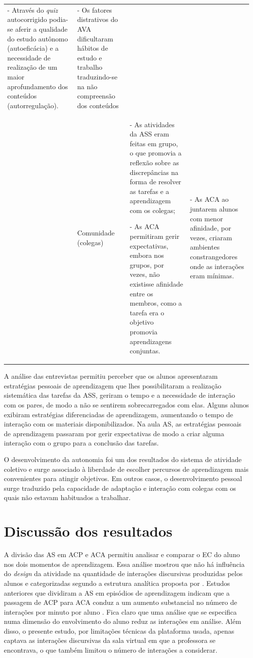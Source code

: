 \documentclass[portuguese]{textolivre}
\begin{document}
\begin{table}[htpb]
\begin{tabular}{p{}p{}p{}p{}}
- Através do \textit{quiz} autocorrigido podia-se aferir a qualidade do estudo autônomo (autoeficácia) e a necessidade de realização de um maior aprofundamento dos conteúdos (autorregulação). & - Os fatores distrativos do AVA dificultaram hábitos de estudo e trabalho traduzindo-se na não compreensão dos conteúdos
\\
& Comunidade (colegas) & - As atividades da ASS eram feitas em grupo, o que promovia a reflexão sobre as discrepâncias na forma de resolver as tarefas e a aprendizagem com os colegas;

- As ACA permitiram gerir expectativas, embora nos grupos, por vezes, não existisse afinidade entre os membros, como a tarefa era o objetivo promovia aprendizagens conjuntas. & - As ACA ao juntarem alunos com menor afinidade, por vezes, criaram ambientes constrangedores onde as interações eram mínimas.
\\
\bottomrule
\end{tabular}
\end{table}

A análise das entrevistas permitiu perceber que os alunos apresentaram estratégias pessoais de aprendizagem que lhes possibilitaram a realização sistemática das tarefas da ASS, geriram o tempo e a necessidade de interação com os pares, de modo a não se sentirem sobrecarregados com elas. Alguns alunos exibiram estratégias diferenciadas de aprendizagem, aumentando o tempo de interação com os materiais disponibilizados. Na aula AS, as estratégias pessoais de aprendizagem passaram por gerir expectativas de modo a criar alguma interação com o grupo para a conclusão das tarefas.

O desenvolvimento da autonomia foi um dos resultados do sistema de atividade coletivo e surge associado à liberdade de escolher percursos de aprendizagem mais convenientes para atingir objetivos. Em outros casos, o desenvolvimento pessoal surge traduzido pela capacidade de adaptação e interação com colegas com os quais não estavam habituados a trabalhar.

\section{Discussão dos resultados}\label{sec-organizacao}
A divisão das AS em ACP e ACA permitiu analisar e comparar o EC do aluno nos dois momentos de aprendizagem. Essa análise mostrou que não há influência do \textit{design} da atividade na quantidade de interações discursivas produzidas pelos alunos e categorizadas segundo a estrutura analítica proposta por \textcite{zhu_interaction_2006}. Estudos anteriores que dividiram a AS em episódios de aprendizagem indicam que a passagem de ACP para ACA conduz a um aumento substancial no número de interações por minuto por aluno \cite{ribeirinha_flipped_2021}. Fica claro que uma análise que se especifica numa dimensão do envolvimento do aluno reduz as interações em análise. Além disso, o presente estudo, por limitações técnicas da plataforma usada, apenas captava as interações discursivas da sala virtual em que a professora se encontrava, o que também limitou o número de interações a considerar.  
\end{document}
